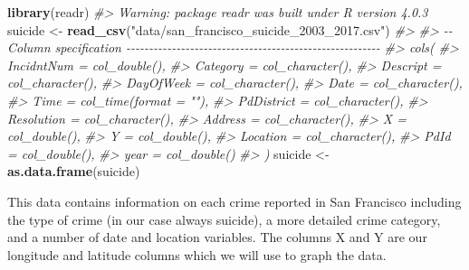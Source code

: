 \documentclass[
  12pt,
]{book}
\newenvironment{Shaded}{\begin{snugshade}}{\end{snugshade}}
\newcommand{\CommentTok}[1]{\textcolor[rgb]{0.37,0.37,0.37}{\textit{#1}}}
\newcommand{\KeywordTok}[1]{\textcolor[rgb]{0.27,0.27,0.27}{\textbf{#1}}}
\newcommand{\NormalTok}[1]{#1}
\newcommand{\StringTok}[1]{\textcolor[rgb]{0.5,0.5,0.5}{#1}}
\begin{document}
\begin{Shaded}
\begin{Highlighting}[]
\KeywordTok{library}\NormalTok{(readr)}
\CommentTok{\#\textgreater{} Warning: package \textquotesingle{}readr\textquotesingle{} was built under R version 4.0.3}
\NormalTok{suicide \textless{}{-}}\StringTok{ }\KeywordTok{read\_csv}\NormalTok{(}\StringTok{"data/san\_francisco\_suicide\_2003\_2017.csv"}\NormalTok{)}
\CommentTok{\#\textgreater{} }
\CommentTok{\#\textgreater{} {-}{-} Column specification {-}{-}{-}{-}{-}{-}{-}{-}{-}{-}{-}{-}{-}{-}{-}{-}{-}{-}{-}{-}{-}{-}{-}{-}{-}{-}{-}{-}{-}{-}{-}{-}{-}{-}{-}{-}{-}{-}{-}{-}{-}{-}{-}{-}{-}{-}{-}{-}{-}{-}{-}{-}{-}{-}{-}{-}}
\CommentTok{\#\textgreater{} cols(}
\CommentTok{\#\textgreater{}   IncidntNum = col\_double(),}
\CommentTok{\#\textgreater{}   Category = col\_character(),}
\CommentTok{\#\textgreater{}   Descript = col\_character(),}
\CommentTok{\#\textgreater{}   DayOfWeek = col\_character(),}
\CommentTok{\#\textgreater{}   Date = col\_character(),}
\CommentTok{\#\textgreater{}   Time = col\_time(format = ""),}
\CommentTok{\#\textgreater{}   PdDistrict = col\_character(),}
\CommentTok{\#\textgreater{}   Resolution = col\_character(),}
\CommentTok{\#\textgreater{}   Address = col\_character(),}
\CommentTok{\#\textgreater{}   X = col\_double(),}
\CommentTok{\#\textgreater{}   Y = col\_double(),}
\CommentTok{\#\textgreater{}   Location = col\_character(),}
\CommentTok{\#\textgreater{}   PdId = col\_double(),}
\CommentTok{\#\textgreater{}   year = col\_double()}
\CommentTok{\#\textgreater{} )}
\NormalTok{suicide \textless{}{-}}\StringTok{ }\KeywordTok{as.data.frame}\NormalTok{(suicide)}
\end{Highlighting}
\end{Shaded}

This data contains information on each crime reported in San Francisco including the type of crime (in our case always suicide), a more detailed crime category, and a number of date and location variables. The columns X and Y are our longitude and latitude columns which we will use to graph the data.
\end{document}
